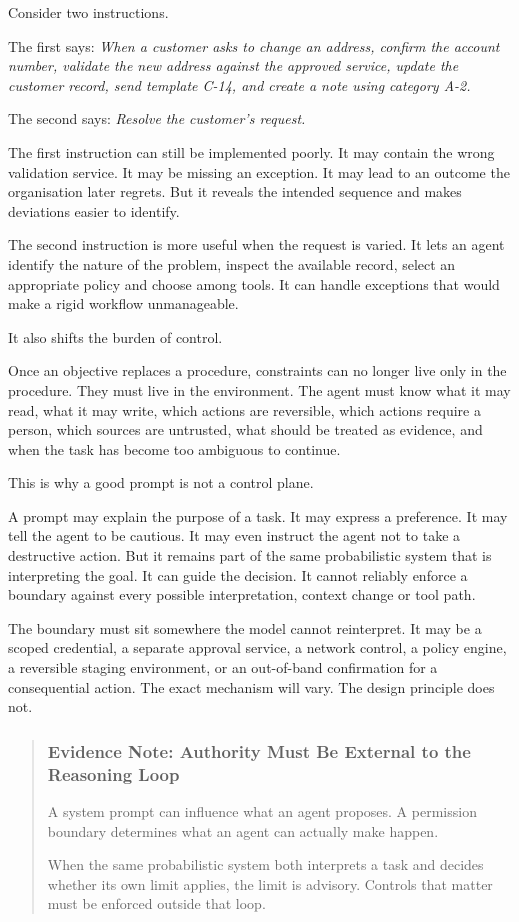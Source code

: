 Consider two instructions.

The first says: \emph{When a customer asks to change an address, confirm
the account number, validate the new address against the approved
service, update the customer record, send template C-14, and create a
note using category A-2.}

The second says: \emph{Resolve the customer's request.}

The first instruction can still be implemented poorly. It may contain
the wrong validation service. It may be missing an exception. It may
lead to an outcome the organisation later regrets. But it reveals the
intended sequence and makes deviations easier to identify.

The second instruction is more useful when the request is varied. It
lets an agent identify the nature of the problem, inspect the available
record, select an appropriate policy and choose among tools. It can
handle exceptions that would make a rigid workflow unmanageable.

It also shifts the burden of control.

Once an objective replaces a procedure, constraints can no longer live
only in the procedure. They must live in the environment. The agent must
know what it may read, what it may write, which actions are reversible,
which actions require a person, which sources are untrusted, what should
be treated as evidence, and when the task has become too ambiguous to
continue.

This is why a good prompt is not a control plane.

A prompt may explain the purpose of a task. It may express a preference.
It may tell the agent to be cautious. It may even instruct the agent not
to take a destructive action. But it remains part of the same
probabilistic system that is interpreting the goal. It can guide the
decision. It cannot reliably enforce a boundary against every possible
interpretation, context change or tool path.

The boundary must sit somewhere the model cannot reinterpret. It may be
a scoped credential, a separate approval service, a network control, a
policy engine, a reversible staging environment, or an out-of-band
confirmation for a consequential action. The exact mechanism will vary.
The design principle does not.

\begin{quote}
\subsubsection{Evidence Note: Authority Must Be External to the
Reasoning
Loop}\label{evidence-note-authority-must-be-external-to-the-reasoning-loop}

A system prompt can influence what an agent proposes. A permission
boundary determines what an agent can actually make happen.

When the same probabilistic system both interprets a task and decides
whether its own limit applies, the limit is advisory. Controls that
matter must be enforced outside that loop.
\end{quote}

